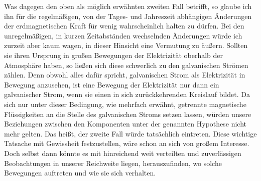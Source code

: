 Was dagegen den oben als möglich erwähnten zweiten Fall betrifft, so glaube ich ihn für die regelmäßigen, von der Tages- und Jahreszeit abhängigen Änderungen der erdmagnetischen Kraft für wenig wahrscheinlich halten zu dürfen. Bei den unregelmäßigen, in kurzen Zeitabständen wechselnden Änderungen würde ich zurzeit aber kaum wagen, in dieser Hinsicht eine Vermutung zu äußern. Sollten sie ihren Ursprung in großen Bewegungen der Elektrizität oberhalb der Atmosphäre haben, so ließen sich diese schwerlich zu den galvanischen Strömen zählen. Denn obwohl alles dafür spricht, galvanischen Strom als Elektrizität in Bewegung anzusehen, ist eine Bewegung der Elektrizität nur dann ein galvanischer Strom, wenn sie einen in sich zurückkehrenden Kreislauf bildet. Da sich nur unter dieser Bedingung, wie mehrfach erwähnt, getrennte magnetische Flüssigkeiten an die Stelle des galvanischen Stroms setzen lassen, würden unsere Beziehungen zwischen den Komponenten unter der genannten Hypothese nicht mehr gelten. Das heißt, der zweite Fall würde tatsächlich eintreten. Diese wichtige Tatsache mit Gewissheit festzustellen, wäre schon an sich von großem Interesse. Doch selbst dann könnte es mit hinreichend weit verteilten und zuverlässigen Beobachtungen in unserer Reichweite liegen, herauszufinden, wo solche Bewegungen auftreten und wie sie sich verhalten.
